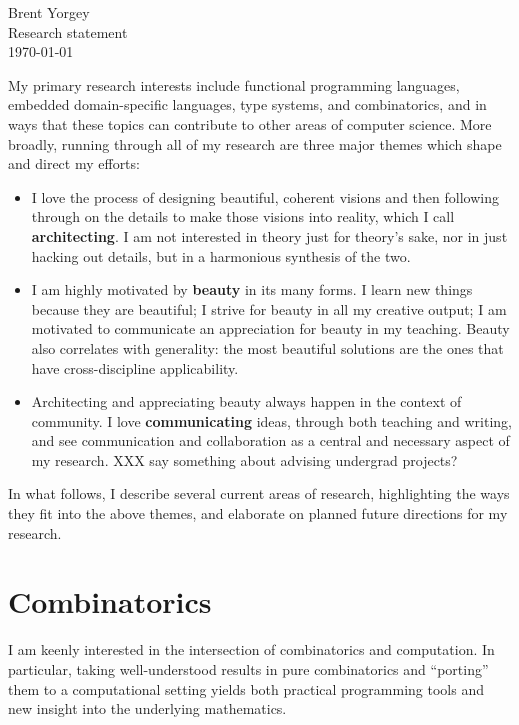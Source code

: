 \documentclass{article}
\begin{document}
\noindent Brent Yorgey \\
Research statement \\
\today
\bigskip

My primary research interests include functional programming
languages, embedded domain-specific languages, type systems, and
combinatorics, and in ways that these topics can contribute to other
areas of computer science.  More broadly, running through all of my
research are three major themes which shape and direct my efforts:

\begin{itemize}
\item I love the process of designing beautiful, coherent visions and
  then following through on the details to make those visions into
  reality, which I call \textbf{architecting}.  I am not interested in
  theory just for theory's sake, nor in just hacking out details, but
  in a harmonious synthesis of the two.
\item I am highly motivated by \textbf{beauty} in its many forms.  I
  learn new things because they are beautiful; I strive for beauty in
  all my creative output; I am motivated to communicate an
  appreciation for beauty in my teaching.  Beauty also correlates
  with generality: the most beautiful solutions are the ones that have
  cross-discipline applicability.
\item Architecting and appreciating beauty always happen in the
  context of community.  I love \textbf{communicating} ideas, through
  both teaching and writing, and see communication and collaboration
  as a central and necessary aspect of my research. XXX say something
  about advising undergrad projects?
\end{itemize}

In what follows, I describe several current areas of research,
highlighting the ways they fit into the above themes, and elaborate on
planned future directions for my research.

\section*{Combinatorics}
\label{sec:combinatorics}

I am keenly interested in the intersection of combinatorics and
computation.  In particular, taking well-understood results in pure
combinatorics and ``porting'' them to a computational setting yields
both practical programming tools and new insight into the underlying
mathematics.
\end{document}

